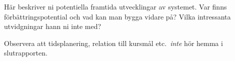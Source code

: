 Här beskriver ni potentiella framtida utvecklingar av systemet. Var finns förbättrings\-poten\-tial och vad kan man bygga vidare på? Vilka intressanta utvidgningar hann ni inte med?

Observera att tids\-planering, relation till kursmål etc.~\emph{inte} hör hemma i slutrapporten.

